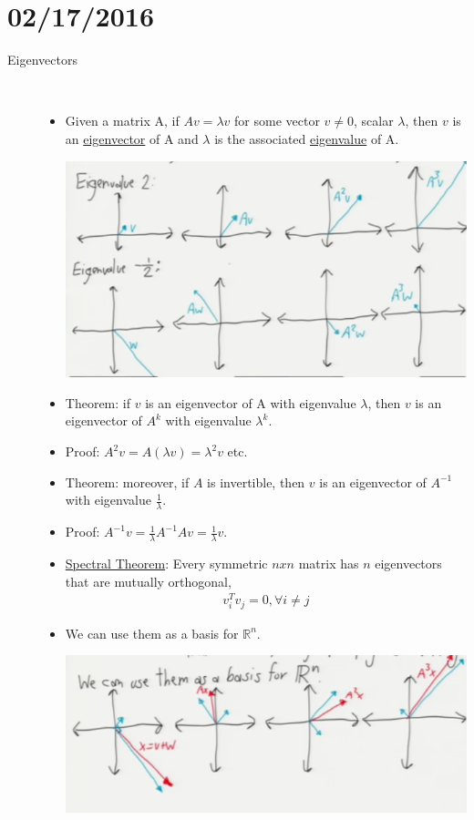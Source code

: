 \documentclass[10pt]{article}
\begin{document}
\newpage
\section*{02/17/2016}
\begin{description}
	\item[Eigenvectors]
	\
		\begin{itemize}
			\item Given a matrix A, if $Av = \lambda v$ for some vector $v \neq 0$, scalar $\lambda$, then $v$ is an \underline{eigenvector} of A and $\lambda$ is the associated \underline{eigenvalue} of A.
			
				\begin{center}
					\includegraphics[scale=0.5]{images/eigenvectors}
				\end{center}
			\item Theorem: if $v$ is an eigenvector of A with eigenvalue $\lambda$, then $v$ is an eigenvector of $A^{k}$ with eigenvalue $\lambda^{k}$.
			\item Proof: $A^{2}v = A(\lambda v) = \lambda^{2}v$ etc.
			\item Theorem: moreover, if $A$ is invertible, then $v$ is an eigenvector of $A^{-1}$ with eigenvalue $\frac{1}{\lambda}$.
			\item Proof: $A^{-1}v = \frac{1}{\lambda}A^{-1}Av = \frac{1}{\lambda}v$.
			\item \underline{Spectral Theorem}: Every symmetric $nxn$ matrix has $n$ eigenvectors that are mutually orthogonal,
				\begin{align*}
					v_{i}^{T}v_{j} = 0, \forall i\neq j
				\end{align*}
			\item We can use them as a basis for $\mathbb{R}^{n}$.
				\begin{center}
					\includegraphics[scale=0.5]{images/basis}

\end{center}
\end{itemize}
\end{description}
\end{document}
